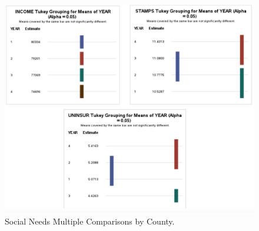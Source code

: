 \documentclass[12pt]{article}
\begin{document}
  \begin{figure}[tbp]
    \label{fig:Social Needs by YearGraph}
      \centering
      \includegraphics[width=\textwidth]{By Year.pdf}
      \caption{Social Needs Multiple Comparisons by County.}
    \end{figure}
\end{document}
